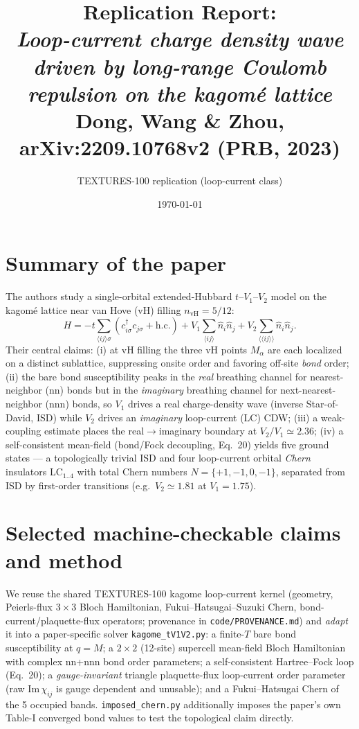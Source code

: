 \documentclass[11pt]{article}
\title{Replication Report: \\
\emph{Loop-current charge density wave driven by long-range Coulomb repulsion
on the kagom\'e lattice}\\
\large Dong, Wang \& Zhou, arXiv:2209.10768v2 (PRB, 2023)}
\author{TEXTURES-100 replication (loop-current class)}
\date{\today}
\begin{document}
\maketitle

\section{Summary of the paper}
The authors study a single-orbital extended-Hubbard $t$--$V_1$--$V_2$ model on
the kagom\'e lattice near van Hove (vH) filling $n_{\mathrm{vH}}=5/12$:
\begin{equation}
H=-t\!\!\sum_{\langle ij\rangle\sigma}\!\!(c^\dagger_{i\sigma}c_{j\sigma}+\mathrm{h.c.})
+V_1\!\!\sum_{\langle ij\rangle}\!\! \hat n_i\hat n_j
+V_2\!\!\sum_{\langle\langle ij\rangle\rangle}\!\!\hat n_i\hat n_j .
\end{equation}
Their central claims: (i) at vH filling the three vH points $M_\alpha$ are each
localized on a distinct sublattice, suppressing onsite order and favoring
off-site \emph{bond} order; (ii) the bare bond susceptibility peaks in the
\emph{real} breathing channel for nearest-neighbor (nn) bonds but in the
\emph{imaginary} breathing channel for next-nearest-neighbor (nnn) bonds, so
$V_1$ drives a real charge-density wave (inverse Star-of-David, ISD) while $V_2$
drives an \emph{imaginary} loop-current (LC) CDW; (iii) a weak-coupling estimate
places the real$\to$imaginary boundary at $V_2/V_1\simeq2.36$; (iv) a
self-consistent mean-field (bond/Fock decoupling, Eq.~20) yields five ground
states --- a topologically trivial ISD and four loop-current orbital
\emph{Chern} insulators LC$_{1..4}$ with total Chern numbers
$N=\{+1,-1,0,-1\}$, separated from ISD by first-order transitions
(e.g.\ $V_2\simeq1.81$ at $V_1=1.75$).

\section{Selected machine-checkable claims and method}
We reuse the shared TEXTURES-100 kagome loop-current kernel (geometry,
Peierls-flux $3\times3$ Bloch Hamiltonian, Fukui--Hatsugai--Suzuki Chern,
bond-current/plaquette-flux operators; provenance in \texttt{code/PROVENANCE.md})
and \emph{adapt} it into a paper-specific solver \texttt{kagome\_tV1V2.py}:
a finite-$T$ bare bond susceptibility at $q=M$; a $2\times2$ (12-site) supercell
mean-field Bloch Hamiltonian with complex nn+nnn bond order parameters; a
self-consistent Hartree--Fock loop (Eq.~20); a \emph{gauge-invariant} triangle
plaquette-flux loop-current order parameter (raw $\mathrm{Im}\,\chi_{ij}$ is
gauge dependent and unusable); and a Fukui--Hatsugai Chern of the 5 occupied
bands. \texttt{imposed\_chern.py} additionally imposes the paper's own Table-I
converged bond values to test the topological claim directly.
\end{document}

